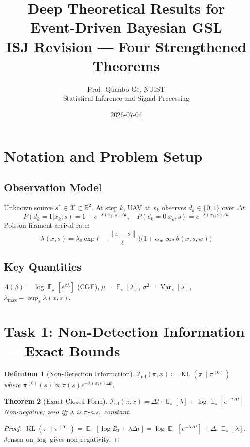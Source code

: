 \documentclass[11pt]{article}
\newtheorem{theorem}{Theorem}
\newtheorem{definition}[theorem]{Definition}
\DeclareMathOperator{\E}{\mathbb{E}}
\DeclareMathOperator{\Var}{\mathrm{Var}}
\DeclareMathOperator{\KL}{\mathrm{KL}}
\begin{document}
\title{Deep Theoretical Results for Event-Driven Bayesian GSL\\
\large ISJ Revision --- Four Strengthened Theorems}
\author{Prof.\ Quanbo Ge, NUIST\\Statistical Inference and Signal Processing}
\date{2026-07-04}
\maketitle
\tableofcontents
\newpage

\section{Notation and Problem Setup}

\subsection{Observation Model}
Unknown source $s^*\in\mathcal{X}\subset\mathbb{R}^2$. At step $k$, UAV at $x_k$ observes $d_k\in\{0,1\}$ over $\Delta t$:
\begin{equation}\label{eq:bernoulli}
P(d_k=1|x_k,s)=1-e^{-\lambda(x_k,s)\Delta t}, \quad P(d_k=0|x_k,s)=e^{-\lambda(x_k,s)\Delta t}
\end{equation}
Poisson filament arrival rate:
\begin{equation}\label{eq:rate}
\lambda(x,s)=\lambda_0\exp\!\Big(-\frac{\|x-s\|}{\ell}\Big)\big(1+\alpha_w\cos\theta(x,s,w)\big)
\end{equation}

\subsection{Key Quantities}
$\Lambda(\beta)=\log\E_\pi[e^{\beta\lambda}]$ (CGF), $\mu=\E_\pi[\lambda]$, $\sigma^2=\Var_\pi[\lambda]$, $\lambda_{\max}=\sup_s\lambda(x,s)$.

\newpage
\section{Task 1: Non-Detection Information --- Exact Bounds}

\begin{definition}[Non-Detection Information]
$\mathcal{I}_{\mathrm{nd}}(\pi,x)\coloneqq\KL(\pi\|\pi^{(0)})$ where $\pi^{(0)}(s)\propto\pi(s)e^{-\lambda(x,s)\Delta t}$.
\end{definition}

\begin{theorem}[Exact Closed-Form]\label{thm:ndi_exact}
$\boxed{\mathcal{I}_{\mathrm{nd}}(\pi,x)=\Delta t\cdot\E_\pi[\lambda]+\log\E_\pi[e^{-\lambda\Delta t}]}$
Non-negative; zero iff $\lambda$ is $\pi$-a.s.\ constant.
\end{theorem}
\begin{proof}
$\KL(\pi\|\pi^{(0)})=\E_\pi[\log Z_0+\lambda\Delta t]=\log\E_\pi[e^{-\lambda\Delta t}]+\Delta t\,\E_\pi[\lambda]$. Jensen on $\log$ gives non-negativity.
\end{proof}
\end{document}
